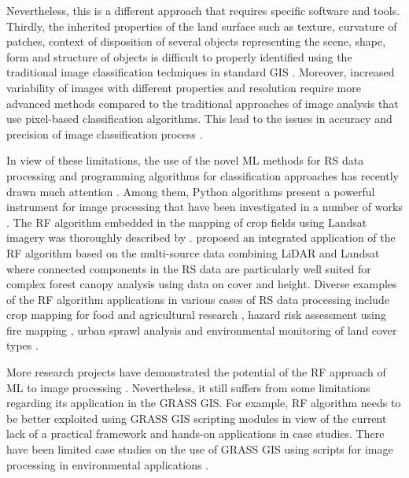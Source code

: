 \documentclass[preprint,12pt,authoryear]{elsarticle}
\begin{document}
Nevertheless, this is a different approach that requires specific software and tools. Thirdly, the inherited properties of the land surface such as texture, curvature of patches, context of disposition of several objects representing the scene, shape, form and structure of objects is difficult to properly identified using the traditional image classification techniques in standard GIS \cite{OUSMANOU2024100239,ZHANG2023129590,BAKR2010592}. Moreover, increased variability of images with different properties and resolution require more advanced methods compared to the traditional approaches of image analysis that use pixel-based classification algorithms. This lead to the issues in accuracy and precision of image classification process \cite{Fisher,McKee}.

In view of these limitations, the use of the novel ML methods for RS data processing and programming algorithms for classification approaches has recently drawn much attention \cite{Ayhan}. Among them, Python algorithms present a powerful instrument for image processing that have been investigated in a number of works \cite{9884244,9883588,Lemenkova202227,9006205,7724471}. The RF algorithm embedded in the mapping of crop fields using Landsat imagery was thoroughly described by \cite{LUCIANO2021106063}. \cite{AHMED201589} proposed an integrated application of the RF algorithm based on the multi-source data combining LiDAR and Landsat where connected components in the RS data are particularly well suited for complex forest canopy analysis using data on cover and height. Diverse examples of the RF algorithm applications in various cases of RS data processing include crop mapping for food and agricultural research \cite{OLIPHANT2019110,TELUGUNTLA2018325}, hazard risk assessment using fire mapping \cite{COLLINS2020111839}, urban sprawl analysis \cite{GHOSH201431} and environmental monitoring of land cover types \cite{MELVILLE201846,GRINAND201368}. 

More research projects have demonstrated the potential of the RF approach of ML to image processing \cite{COLLINS2020111839,WEI2020112005,WANG202294}. Nevertheless, it still suffers from some limitations regarding its application in the GRASS GIS. For example, RF algorithm needs to be better exploited using GRASS GIS scripting modules in view of the current lack of a practical framework and hands-on applications in case studies. There have been limited case studies on the use of GRASS GIS using scripts for image processing in environmental applications \cite{STRIGARO201668,geomatics5010005,ROCCHINI2017166,7326254}. 
\end{document}
